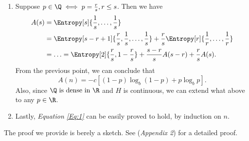 \documentclass{subfiles}
\begin{document}
\begin{proof*}
\begin{enumerate}
            \item Suppose \(p \in \Q \iff p = \tfrac{r}{s}, r \le s\).
                Then we have 
                \[\begin{aligned}
                    A(s) & = \Entropy[s]{\frac{1}{s}, \ldots, \frac{1}{s}} \\ 
                        & = \Entropy[s - r + 1]{\frac{r}{s}, \frac{1}{s}, \ldots, \frac{1}{s}} 
                          + \frac{r}{s} \Entropy[r]{\frac{1}{r}, \ldots, \frac{1}{r}} \\ 
                        & = \ldots = \Entropy[2]{\frac{r}{s}, 1 - \frac{r}{s}}
                          + \frac{s - r}{s} A(s - r) + \frac{r}{s} A(s).
                \end{aligned}\]
                From the previous point, we can conclude that 
                \[
                    A(n) = -c \left\lbrack
                        (1 - p) \log_{b} (1 - p) + p \log_{b} p
                    \right\rbrack.
                \]
                Also, since \(\Q \text{ is dense in } \R\) and \(H\) is continuous,
                we can extend what above to any \(p \in \R\).

            \item Lastly, \emph{Equation \eqref{Eq:1}} can be easily proved to hold,
                by induction on \(n\).

        \end{enumerate}
    \end{proof*}
    The proof we provide is berely a sketch.
    See \cite{shannon1948} (\emph{Appendix 2}) for a detailed proof.
\end{document}

